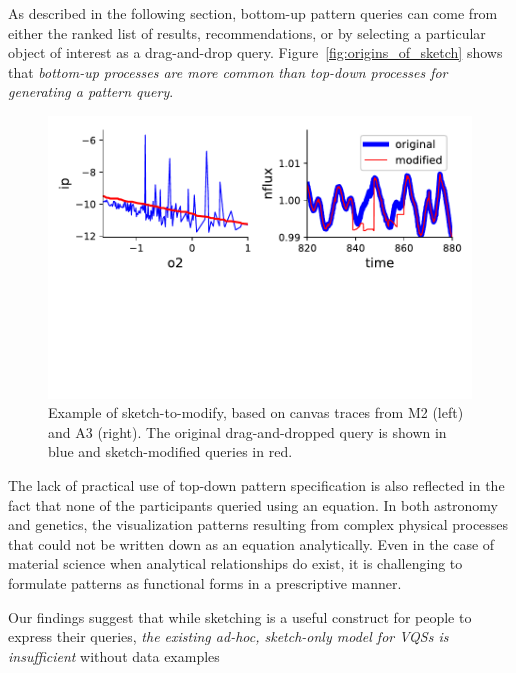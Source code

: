  As described in the following section,
 bottom-up pattern queries can come from either
 the ranked list of results,
 recommendations, or by selecting a
 particular object of interest as a drag-and-drop query.
 Figure~\ref{fig:origins_of_sketch} shows that
 \emph{bottom-up processes are more common
 than top-down processes for generating a pattern query}.
 \begin{figure}[h!]
     \centering
     \includegraphics[width=\columnwidth]{figures/QueryModificationBySketch.pdf}
     \caption{Example of sketch-to-modify, based on canvas traces from M2 (left) and A3 (right). The original drag-and-dropped query is shown in blue and sketch-modified queries in red.}%
     \label{query_modification}
     \vspace{-10pt}
 \end{figure}
 \par The lack of practical use of top-down pattern
 specification is also reflected in the fact
 that none of the participants queried using an equation.
 In both astronomy and genetics, the visualization patterns
 resulting from complex physical processes
 that could not be written down as an equation analytically.
 Even in the case of material science when analytical
 relationships do exist, it is challenging to formulate patterns as functional forms in a prescriptive manner.
 \par Our findings suggest that while sketching
 is a useful construct for people to express their queries,
 \emph{the existing ad-hoc, sketch-only model for VQSs
 is insufficient } without data examples

